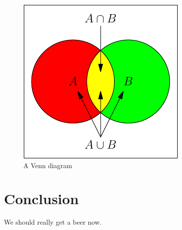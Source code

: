 \documentclass[12pt,openany,oneside]{report}
\begin{document}
\begin{figure}[htbp]
  \begin{center}        
    \includegraphics{venn}
    \caption{A Venn diagram}
    \label{venn}
  \end{center}
\end{figure}



\chapter{Conclusion}

We should really get a beer now.

\singlespacing
{

}

\vfill
\textheight 9in
\eject
\topmargin -1in
\clearpage
{}
{}
\printindex
\end{document}
